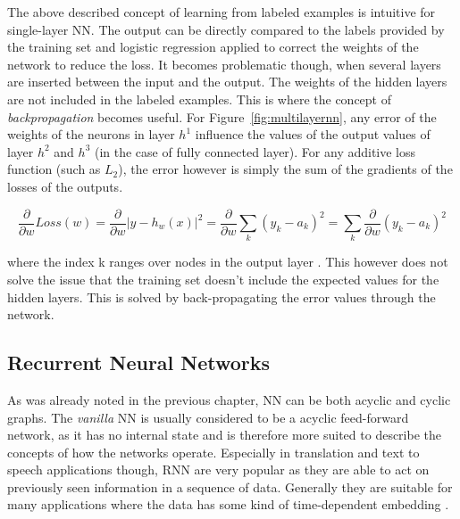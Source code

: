 The above described concept of learning from labeled examples is intuitive for single-layer \ac {NN}. The output can be
directly compared to the labels provided by the training set and logistic regression applied to correct the weights of
the network to reduce the loss. It becomes problematic though, when several layers are inserted between the input and
the output. The weights of the hidden layers are not included in the labeled examples. This is where the concept of
\emph{backpropagation} becomes useful. For Figure~\ref{fig:multilayernn}, any error of the weights of the neurons in
layer $h^1$ influence the values of the output values of layer $h^2$ and $h^3$ (in the case of fully connected layer).
For any additive loss function (such as $L_2$), the error however is simply the sum of the gradients of the losses of
the outputs\cite[p.733f.]{russell2016artificial}. 

\begin{equation}
\frac{\partial}{\partial w} Loss(w) =  \frac{\partial}{\partial w} \vert y-h_w(x) \vert ^2 = \frac{\partial}{\partial w} \sum_k{(y_k - a_k)^2} =  \sum_k{\frac{\partial}{\partial w}(y_k - a_k)^2} 
    \label{equ:errorssum}
\end{equation}

where the index k ranges over nodes in the output layer \cite[p.733f.]{russell2016artificial}. This however does not
solve the issue that the training set doesn't include the expected values for the hidden layers. This is solved by
back-propagating the error values through the network. %


\subsection{Recurrent Neural Networks}%
\label{sec:recurrent_neural_networks}

As was already noted in the previous chapter, \ac {NN} can be both acyclic and cyclic graphs. The
\emph{vanilla} \ac {NN} is usually considered to be a acyclic feed-forward network, as it has no internal state and is
therefore more suited to describe the concepts of how the networks operate. Especially in translation and text to speech
applications though, \ac {RNN} are very popular as they are able to act on previously seen information in a sequence of
data. Generally they are suitable for many applications where the data has some kind of time-dependent embedding
\cite[p.373]{Goodfellow-et-al-2016}.

